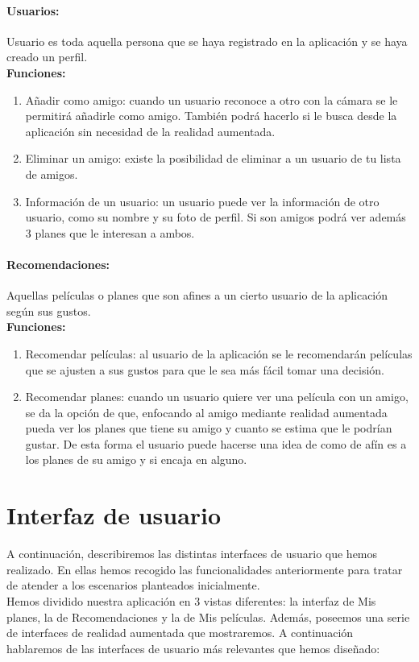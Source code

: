\paragraph{\large Usuarios:\\}
Usuario es toda aquella persona que se haya registrado en la aplicación y se haya creado un perfil.
\\
\textbf{Funciones:}
\begin{enumerate}
    \item Añadir como amigo: cuando un usuario reconoce a otro con la cámara se le permitirá añadirle como amigo. También podrá hacerlo si le busca desde la aplicación sin necesidad de la realidad aumentada.
    \item Eliminar un amigo: existe la posibilidad de eliminar a un usuario de tu lista de amigos.
    \item Información de un usuario: un usuario puede ver la información de otro usuario, como su nombre y su foto de perfil. Si son amigos podrá ver además 3 planes que le interesan a ambos.
\end{enumerate} 

\paragraph{\large Recomendaciones:\\}
Aquellas películas o planes que son afines a un cierto usuario de la aplicación según sus gustos.
\\
\textbf{Funciones:}
\begin{enumerate}
    \item Recomendar películas: al usuario de la aplicación se le recomendarán películas que se ajusten a sus gustos para que le sea más fácil tomar una decisión.
    \item Recomendar planes: cuando un usuario quiere ver una película con un amigo, se da la opción de que, enfocando al amigo mediante realidad aumentada pueda ver los planes que tiene su amigo y 
    cuanto se estima que le podrían gustar. De esta forma el usuario puede hacerse una idea de como de afín es a los planes de su amigo y si encaja en alguno.
\end{enumerate} 

\section{Interfaz de usuario}
\label{makereference3.4}
A continuación, describiremos las distintas interfaces de usuario que hemos realizado. En ellas hemos recogido las funcionalidades anteriormente para tratar de atender a los escenarios planteados inicialmente.
\\
Hemos dividido nuestra aplicación en 3 vistas diferentes: la interfaz de Mis planes, la de Recomendaciones y la de Mis películas. Además, poseemos una serie de interfaces de realidad aumentada que mostraremos. A continuación hablaremos
de las interfaces de usuario más relevantes que hemos diseñado:
